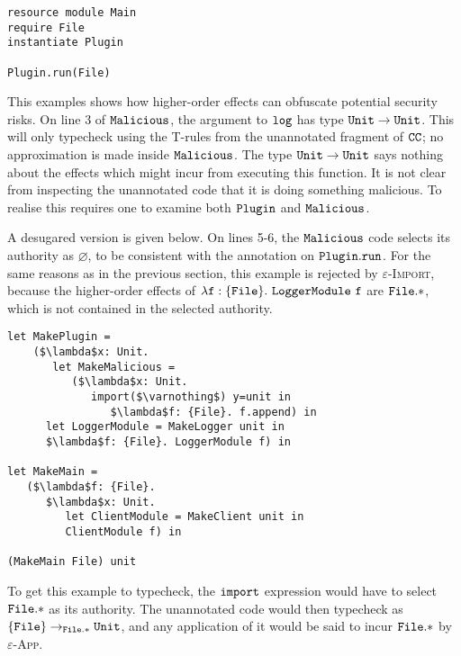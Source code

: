 \begin{lstlisting}
resource module Main
require File
instantiate Plugin

Plugin.run(File)
\end{lstlisting}

This examples shows how higher-order effects can obfuscate potential security risks. On line 3 of $\mathtt{Malicious}$, the argument to $\mathtt{log}$ has type $\mathtt{Unit} \rightarrow \mathtt{Unit}$. This will only typecheck using the \textsc{T-}rules from the unannotated fragment of $\mathtt{CC}$; no approximation is made inside $\mathtt{Malicious}$. The type $\mathtt{Unit} \rightarrow \mathtt{Unit}$ says nothing about the effects which might incur from executing this function. It is not clear from inspecting the unannotated code that it is doing something malicious. To realise this requires one to examine both $\mathtt{Plugin}$ and $\mathtt{Malicious}$.

A desugared version is given below. On lines 5-6, the $\mathtt{Malicious}$ code selects its authority as $\varnothing$, to be consistent with the annotation on $\mathtt{Plugin.run}$. For the same reasons as in the previous section, this example is rejected by \textsc{$\varepsilon$-Import}, because the higher-order effects of $\mathtt{\lambda f: \{ File \}.~LoggerModule~f}$ are $\mathtt{File.*}$, which is not contained in the selected authority.

\begin{lstlisting}
let MakePlugin =
	($\lambda$x: Unit.
	   let MakeMalicious =
	      ($\lambda$x: Unit.
	         import($\varnothing$) y=unit in
	            $\lambda$f: {File}. f.append) in
      let LoggerModule = MakeLogger unit in
      $\lambda$f: {File}. LoggerModule f) in

let MakeMain =
   ($\lambda$f: {File}.
      $\lambda$x: Unit.
         let ClientModule = MakeClient unit in
         ClientModule f) in

(MakeMain File) unit
\end{lstlisting}

To get this example to typecheck, the $\mathtt{import}$ expression would have to select $\mathtt{File.*}$ as its authority. The unannotated code would then typecheck as $\mathtt{ \{ File \} \rightarrow_{\mathtt{File.*}} Unit }$, and any application of it would be said to incur $\mathtt{ File.* }$ by \textsc{$\varepsilon$-App}.





























